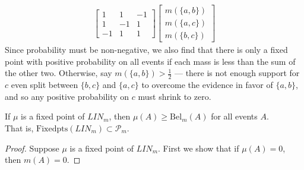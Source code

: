 \documentclass{article}
\begin{document}
\begin{computation}
\begin{align*}
\begin{bmatrix}
            1 & 1 & -1 \\
            1 & -1 & 1 \\
            -1 & 1 & 1
        \end{bmatrix}
        \begin{bmatrix}
            m(\{a,b\}) \\ m(\{a,c\}) \\ m(\{b,c\})
        \end{bmatrix}
    \end{align*}
    Since probability must be non-negative, we also find that there is only a fixed point
    with positive probability on all events if each mass is less than the sum of the other two. 
    Otherwise, say $m(\{a,b\}) > \frac12$ --- there is not enough support for $c$ even split between $\{b,c\}$ and $\{a,c\}$ to overcome the evidence in favor of $\{a,b\}$, and so any positive probability on $c$ must shrink to zero.
        


\begin{conj}
    If $\mu$ is a fixed point of $\mathit{LIN}_m$, then 
    $\mu(A) \ge \mathrm{Bel}_m(A)$ for all events $A$.
    \\
    That is, $\mathrm{Fixedpts}( \mathit{LIN}_m ) \subset \mathcal P_m$.
\end{conj}
\begin{proof}
    Suppose $\mu$ is a fixed point of $\mathit{LIN}_m$.
    First we show that if $\mu(A) = 0$, then $m(A) = 0$. 
    
    


\end{proof}
\end{computation}
\end{document}
